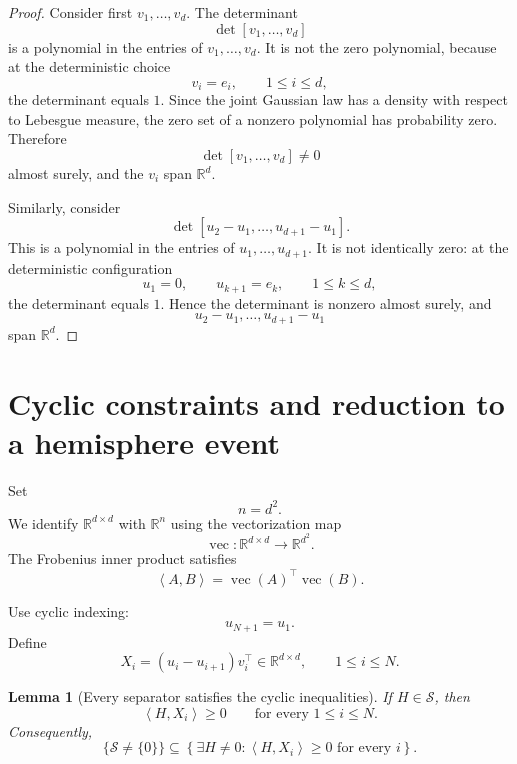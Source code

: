 \documentclass[11pt]{article}
\newtheorem{lemma}[theorem]{Lemma}
\newcommand{\R}{\mathbb{R}}
\newcommand{\ip}[2]{\left\langle #1,#2\right\rangle}
\newcommand{\cS}{\mathcal{S}}
\newcommand{\1}{\mathbf{1}}
\newcommand{\vecop}{\operatorname{vec}}
\begin{document}
\begin{proof}
Consider first \(v_1,\dots,v_d\). The determinant
\[
\det[v_1,\dots,v_d]
\]
is a polynomial in the entries of \(v_1,\dots,v_d\). It is not the zero
polynomial, because at the deterministic choice
\[
v_i=e_i,\qquad 1\le i\le d,
\]
the determinant equals \(1\). Since the joint Gaussian law has a density
with respect to Lebesgue measure, the zero set of a nonzero polynomial
has probability zero. Therefore
\[
\det[v_1,\dots,v_d]\neq 0
\]
almost surely, and the \(v_i\) span \(\R^d\).

Similarly, consider
\[
\det[u_2-u_1,\dots,u_{d+1}-u_1].
\]
This is a polynomial in the entries of \(u_1,\dots,u_{d+1}\). It is not
identically zero: at the deterministic configuration
\[
u_1=0,
\qquad
u_{k+1}=e_k,
\qquad
1\le k\le d,
\]
the determinant equals \(1\). Hence the determinant is nonzero almost
surely, and
\[
u_2-u_1,\dots,u_{d+1}-u_1
\]
span \(\R^d\).
\end{proof}

\section{Cyclic constraints and reduction to a hemisphere event}

Set
\[
n=d^2.
\]
We identify \(\R^{d\times d}\) with \(\R^n\) using the vectorization map
\[
\vecop:\R^{d\times d}\to\R^{d^2}.
\]
The Frobenius inner product satisfies
\[
\ip{A}{B}
=
\vecop(A)^\top\vecop(B).
\]

Use cyclic indexing:
\[
u_{N+1}=u_1.
\]
Define
\begin{equation}
X_i
=
(u_i-u_{i+1})v_i^\top
\in\R^{d\times d},
\qquad
1\le i\le N.
\label{eq:cyclic-X}
\end{equation}

\begin{lemma}[Every separator satisfies the cyclic inequalities]
\label{lem:separator-cyclic}
If \(H\in\cS\), then
\begin{equation}
\ip{H}{X_i}\ge 0
\qquad
\text{for every }1\le i\le N.
\label{eq:cyclic-inequality}
\end{equation}
Consequently,
\begin{equation}
\{\cS\neq\{0\}\}
\subseteq
\left\{
\exists H\neq 0:
\ip{H}{X_i}\ge 0
\text{ for every }i
\right\}.
\label{eq:separator-subset}
\end{equation}
\end{lemma}
\end{document}
